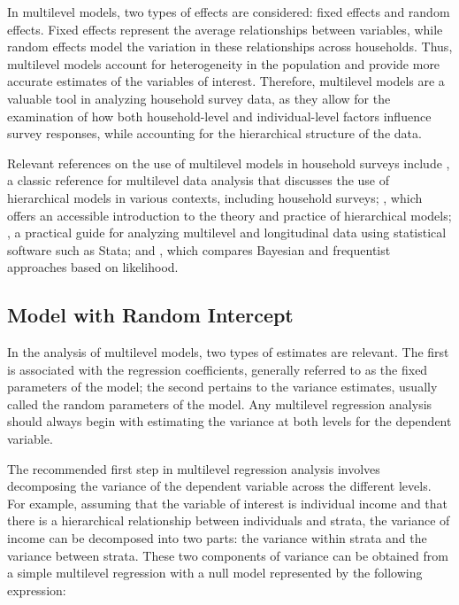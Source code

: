 \documentclass[
  12pt,
]{book}
\begin{document}
In multilevel models, two types of effects are considered: fixed effects and random effects. Fixed effects represent the average relationships between variables, while random effects model the variation in these relationships across households. Thus, multilevel models account for heterogeneity in the population and provide more accurate estimates of the variables of interest. Therefore, multilevel models are a valuable tool in analyzing household survey data, as they allow for the examination of how both household-level and individual-level factors influence survey responses, while accounting for the hierarchical structure of the data.

Relevant references on the use of multilevel models in household surveys include \citet{goldstein2011}, a classic reference for multilevel data analysis that discusses the use of hierarchical models in various contexts, including household surveys; \citet{gelmanhill2019}, which offers an accessible introduction to the theory and practice of hierarchical models; \citet{rabe2012multilevel}, a practical guide for analyzing multilevel and longitudinal data using statistical software such as Stata; and \citet{browne2006comparison}, which compares Bayesian and frequentist approaches based on likelihood.

\subsection{Model with Random Intercept}\label{model-with-random-intercept}

In the analysis of multilevel models, two types of estimates are relevant. The first is associated with the regression coefficients, generally referred to as the fixed parameters of the model; the second pertains to the variance estimates, usually called the random parameters of the model. Any multilevel regression analysis should always begin with estimating the variance at both levels for the dependent variable.

The recommended first step in multilevel regression analysis involves decomposing the variance of the dependent variable across the different levels. For example, assuming that the variable of interest is individual income and that there is a hierarchical relationship between individuals and strata, the variance of income can be decomposed into two parts: the variance within strata and the variance between strata. These two components of variance can be obtained from a simple multilevel regression with a null model represented by the following expression:
\end{document}
